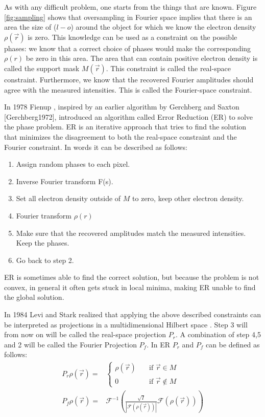 As with any difficult problem, one starts from the things that are known. Figure \ref{fig:sampling} shows that oversampling in Fourier space implies that there is an area the size of ($l-o$) around the object for which we know the electron density $\rho(\vec{r})$ is zero. This knowledge can be used as a constraint on the possible phases: we know that a correct choice of phases would make the corresponding $\rho(r)$ be zero in this area. The area that can contain positive electron density is called the support mask $M(\vec{r})$. This constraint is called the real-space constraint. Furthermore, we know that the recovered Fourier amplitudes should agree with the measured intensities. This is called the Fourier-space constraint. 

In 1978 Fienup \cite{Fienup1978}, inspired by an earlier algorithm by Gerchberg and Saxton [Gerchberg1972], introduced an algorithm called Error Reduction (ER) to solve the phase problem. ER is an iterative approach that tries to find the solution that minimizes the disagreement to both the real-space constraint and the Fourier constraint. In words it can be described as follows:\\
\begin{enumerate}
\item Assign random phases to each pixel.
\item Inverse Fourier transform F(s).
\item Set all electron density outside of $M$ to zero, keep other electron density.
\item Fourier transform $\rho(r)$
\item Make sure that the recovered amplitudes match the measured intensities. Keep the phases.
\item Go back to step 2.\\
\end{enumerate}


ER is sometimes able to find the correct solution, but because the problem is not convex, in general it often gets stuck in local minima, making ER unable to find the global solution.

In 1984 Levi and Stark realized that applying the above described constraints can be interpreted as projections in a multidimensional Hilbert space \cite{Stark1984}. Step 3 will from now on will be called the real-space projection $P_r$. A combination of step 4,5 and 2 will be called the Fourier Projection $P_f$.  In ER $P_r$ and $P_f$ can be defined as follows:
\begin{align}\label{eq:ER}
P_r \rho\left(\vec{r}\right) =& \begin{cases} \rho\left(\vec{r}\right) \quad &\mathrm{if}\,\,
    \vec{r} \in M\\0 \quad & \mathrm{if}\,\, \vec{r} \not\in M \end{cases}\\
P_f \rho(\vec{r}) =& \mathcal{F}^{-1}\left( \frac{\sqrt{I}}{|\mathcal{F}(\rho(\vec{r}))|}\mathcal{F}(\rho(\vec{r})) \right)
\end{align}


